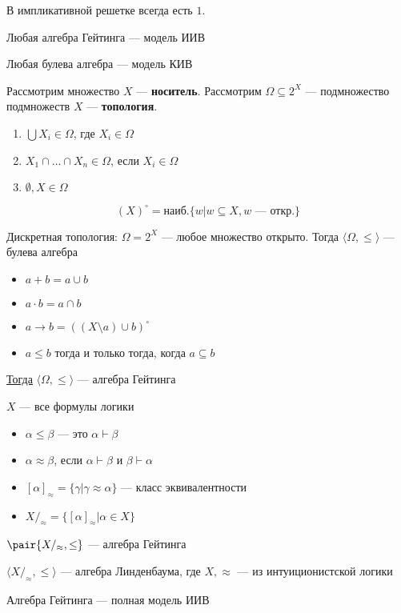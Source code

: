 \documentclass[english]{article}
\begin{document}
\begin{lemma}
	В импликативной решетке всегда есть \(1\).
	\label{orgb368e1b}
\end{lemma}
\begin{theorem}
	Любая алгебра Гейтинга --- модель ИИВ
	\label{org70fcbef}
\end{theorem}
\begin{theorem}
	Любая булева алгебра --- модель КИВ
	\label{org0965855}
\end{theorem}
\begin{definition}
	Рассмотрим множество \(X\) --- \textbf{носитель}. Рассмотрим \(\Omega \subseteq 2^X\) --- подмножество подмножеств \(X\) --- \textbf{топология}.
	\begin{enumerate}
		\item \(\bigcup X_i \in \Omega\), где \(X_i \in \Omega\)
		\item \(X_1 \cap \dots \cap X_n \in \Omega\), если \(X_i \in \Omega\)
		\item \(\emptyset, X \in \Omega\)
	\end{enumerate}
	\label{org963e84c}
\end{definition}
\begin{definition}
	\[ (X)^\circ = \text{наиб.}\{w \big| w \subseteq X, w\text{ --- откр.} \} \]
	\label{org81f1bd5}
\end{definition}
\begin{examp}
	Дискретная топология: \(\Omega = 2^X\) --- любое множество открыто. Тогда \(\langle \Omega, \le \rangle\) --- булева алгебра
	\label{orgd5b5287}
\end{examp}
\begin{theorem}
	\-
	\begin{itemize}
		\item \(a + b = a \cup b\)
		\item \(a \cdot b = a \cap b\)
		\item \(a \to b = \left((X \setminus a) \cup b\right)^\circ\)
		\item \(a \le b\) тогда и только тогда, когда \(a \subseteq b\)
	\end{itemize}
	\uline{Тогда} \(\langle \Omega, \le \rangle\) --- алгебра Гейтинга
	\label{orgb437329}
\end{theorem}
\begin{definition}
	\(X\) --- все формулы логики
	\begin{itemize}
		\item \(\alpha \le \beta\) --- это \(\alpha \vdash \beta\)
		\item \(\alpha \approx \beta\), если \(\alpha \vdash \beta\) и \(\beta \vdash \alpha\)
		\item \([\alpha]_\approx = \{\gamma \big| \gamma \approx \alpha\}\) --- класс эквивалентности
		\item \(X/_\approx = \{[\alpha]_\approx \big| \alpha \in X\}\)
	\end{itemize}
	\(\pair{X/_\approx, \le}\) --- алгебра Гейтинга
	\label{orgad7fdc5}
\end{definition}
\beginproperty
\begin{property}
	\(\langle X/_\approx, \le \rangle\) --- алгебра Линденбаума, где \(X, \approx\) --- из интуиционистской логики
	\label{org4ceb224}
\end{property}
\begin{theorem}
	Алгебра Гейтинга --- полная модель ИИВ
	\label{orga6b2edc}
\end{theorem}
\end{document}
